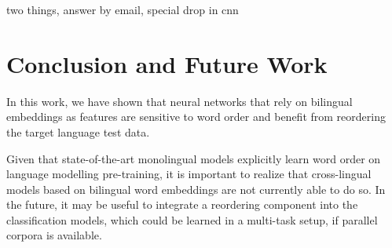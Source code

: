 \documentclass[11pt,a4paper]{article}
\begin{document}
two things, answer by email, special drop in cnn


\section{Conclusion and Future Work}

In this work, we have shown that neural networks that rely on bilingual embeddings as features
are sensitive to word order and benefit from reordering the target language test data. 

Given that state-of-the-art monolingual models explicitly learn word order on language modelling pre-training, it is important to realize that cross-lingual models based on bilingual word embeddings are not currently able to do so. In the future, it may be useful to integrate a reordering component into the classification models, which could be learned in a multi-task setup, if parallel corpora is available.




\end{document}
